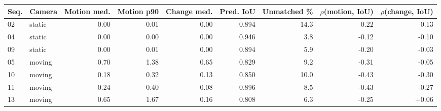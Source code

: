 \begin{tabular}{llrrrrrrr}
\toprule
Seq. & Camera & Motion med. & Motion p90 & Change med. & Pred. IoU & Unmatched \% & $\rho$(motion, IoU) & $\rho$(change, IoU) \\
\midrule
02 & static & 0.00 & 0.01 & 0.00 & 0.894 & 14.3 & -0.22 & -0.13 \\
04 & static & 0.00 & 0.00 & 0.00 & 0.946 & 3.8 & -0.12 & -0.10 \\
09 & static & 0.00 & 0.01 & 0.00 & 0.894 & 5.9 & -0.20 & -0.03 \\
05 & moving & 0.70 & 1.38 & 0.65 & 0.829 & 9.2 & -0.31 & -0.05 \\
10 & moving & 0.18 & 0.32 & 0.13 & 0.850 & 10.0 & -0.43 & -0.30 \\
11 & moving & 0.24 & 0.40 & 0.08 & 0.896 & 8.5 & -0.43 & -0.27 \\
13 & moving & 0.65 & 1.67 & 0.16 & 0.808 & 6.3 & -0.25 & +0.06 \\
\bottomrule
\end{tabular}
